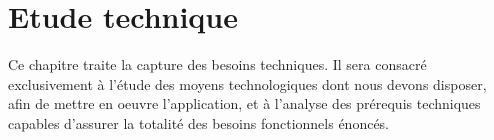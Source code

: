 \chapter{Etude technique}
Ce chapitre traite la capture des besoins techniques. Il sera consacré
exclusivement à l’étude des moyens technologiques dont nous devons
disposer, afin de mettre en oeuvre l’application, et à l’analyse des prérequis
techniques capables d’assurer la totalité des besoins fonctionnels énoncés.\\


%


